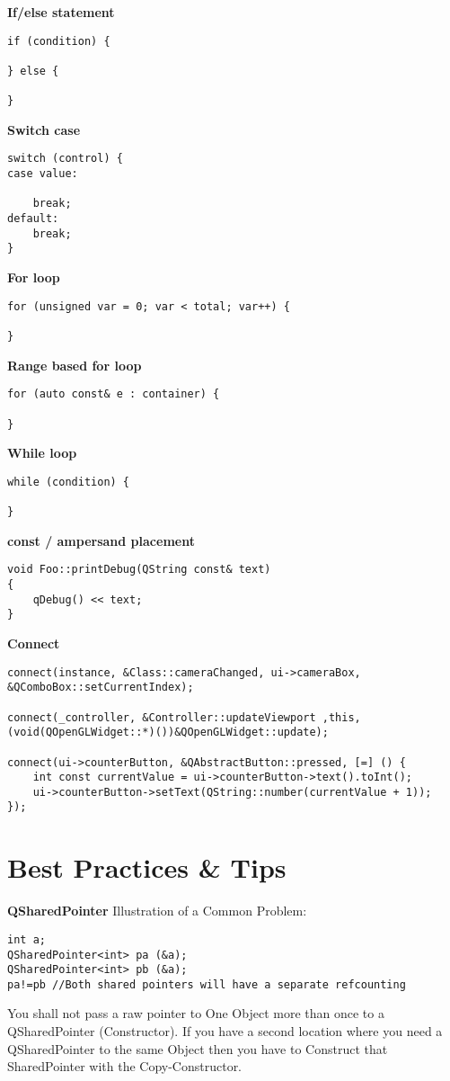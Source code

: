 \textbf{If/else statement}
\begin{lstlisting}
if (condition) {

} else {

}
\end{lstlisting}
\textbf{Switch case}
\begin{lstlisting}
switch (control) {
case value:

	break;
default:
	break;
}
\end{lstlisting}
\textbf{For loop}
\begin{lstlisting}
for (unsigned var = 0; var < total; var++) {

}
\end{lstlisting}
\textbf{Range based for loop}
\begin{lstlisting}
for (auto const& e : container) {

}
\end{lstlisting}
\textbf{While loop}
\begin{lstlisting}
while (condition) {

}
\end{lstlisting}
\textbf{const / ampersand placement}
\begin{lstlisting}
void Foo::printDebug(QString const& text)
{
    qDebug() << text;
}
\end{lstlisting}
\textbf{Connect}
\begin{lstlisting}
connect(instance, &Class::cameraChanged, ui->cameraBox, &QComboBox::setCurrentIndex);

connect(_controller, &Controller::updateViewport ,this, (void(QOpenGLWidget::*)())&QOpenGLWidget::update);

connect(ui->counterButton, &QAbstractButton::pressed, [=] () {
    int const currentValue = ui->counterButton->text().toInt();
    ui->counterButton->setText(QString::number(currentValue + 1));
});
\end{lstlisting}
\newpage
\section{Best Practices \& Tips}
\textbf{QSharedPointer}
Illustration of a Common Problem:
\begin{lstlisting}
int a;
QSharedPointer<int> pa (&a);
QSharedPointer<int> pb (&a);
pa!=pb //Both shared pointers will have a separate refcounting
\end{lstlisting}
You shall not pass a raw pointer to One Object more than once to a QSharedPointer (Constructor). 
If you have a second location where you need a QSharedPointer to the same Object then you have to Construct that SharedPointer with the Copy-Constructor.

